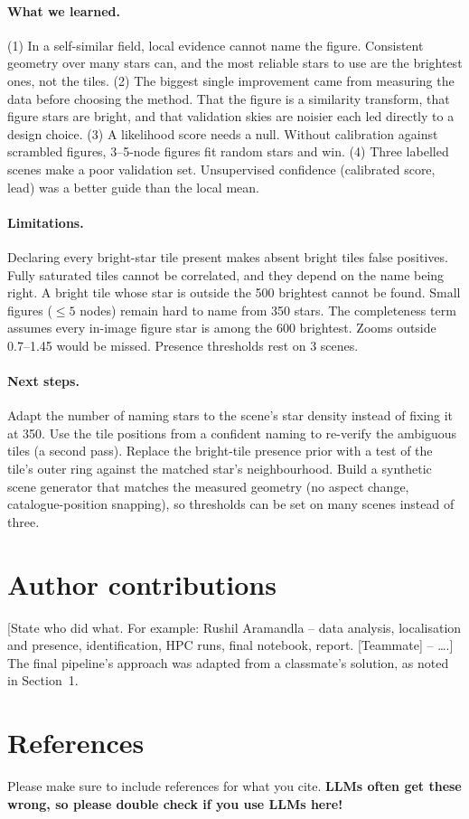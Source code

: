 \documentclass[a4paper,11pt]{article}
\newcommand{\fillin}[1]{{\color{red}[#1]}}
\begin{document}
\paragraph{What we learned.} (1) In a self-similar field, local evidence cannot name the figure. Consistent geometry
over many stars can, and the most reliable stars to use are the brightest ones, not the tiles. (2) The
biggest single improvement came from measuring the data before choosing the method. That the figure is a similarity
transform, that figure stars are bright, and that validation skies are noisier each led directly to a design choice.
(3) A likelihood score needs a null. Without calibration against scrambled figures, 3--5-node figures fit random stars
and win. (4) Three labelled scenes make a poor validation set. Unsupervised confidence (calibrated score, lead) was a
better guide than the local mean.

\paragraph{Limitations.} Declaring every bright-star tile present makes absent bright tiles false positives. Fully saturated tiles cannot be correlated, and they depend on the name being right. A bright tile
whose star is outside the 500 brightest cannot be found. Small figures ($\le5$ nodes) remain hard to name from 350
stars. The completeness term assumes every in-image figure star is among the 600 brightest. Zooms outside 0.7--1.45 would be missed.
Presence thresholds rest on 3 scenes.

\paragraph{Next steps.} Adapt the number of naming stars to the scene's star density instead of fixing it at 350. Use
the tile positions from a confident naming to re-verify the ambiguous tiles (a second pass). Replace the bright-tile
presence prior with a test of the tile's outer ring against the matched star's neighbourhood. Build a synthetic scene
generator that matches the measured geometry (no aspect change, catalogue-position snapping), so thresholds can be set
on many scenes instead of three.

\section{Author contributions}
\fillin{State who did what. For example: Rushil Aramandla -- data analysis, localisation and presence, identification,
HPC runs, final notebook, report. [Teammate] -- \dots.} The final pipeline's approach was adapted from a classmate's
solution, as noted in Section~1.

\section{References}
Please make sure to include references for what you cite. \textbf{LLMs often get these wrong, so please double check if you use LLMs here!}

\printbibliography
\end{document}
